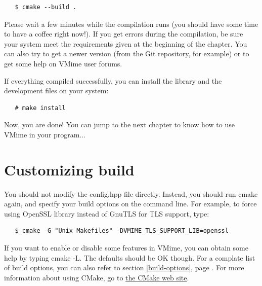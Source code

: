 \begin{verbatim}
   $ cmake --build .
\end{verbatim}

Please wait a few minutes while the compilation runs (you should have some
time to have a coffee right now!). If you get errors during the compilation,
be sure your system meet the requirements given at the beginning of the
chapter. You can also try to get a newer version (from the Git repository, for
example) or to get some help on VMime user forums.

If everything compiled successfully, you can install the library and
the development files on your system:

\begin{verbatim}
   # make install
\end{verbatim}


Now, you are done! You can jump to the next chapter to know how to use VMime
in your program...


\section{\label{custom-build}Customizing build}

You should not modify the {\vcode config.hpp} file directly. Instead, you
should run {\vcode cmake} again, and specify your build options on the command
line. For example, to force using OpenSSL library instead of GnuTLS for TLS
support, type:

\begin{verbatim}
   $ cmake -G "Unix Makefiles" -DVMIME_TLS_SUPPORT_LIB=openssl
\end{verbatim}

If you want to enable or disable some features in VMime, you can obtain some
help by typing {\vcode cmake -L}. The defaults should be OK though. For a
complate list of build options, you can also refer to section
\ref{build-options}, page \pageref{build-options}. For more information about
using CMake, go to \href{http://www.cmake.org/}{the CMake web site}.



